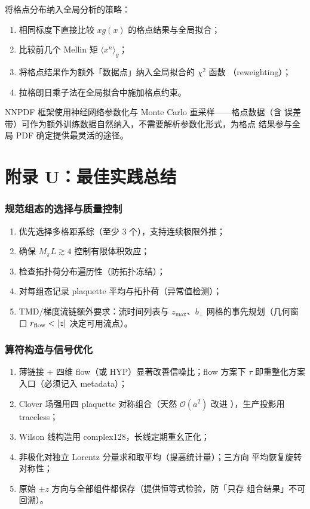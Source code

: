 \documentclass[11pt,a4paper]{ctexart}
\newcommand{\abs}[1]{\lvert #1\rvert}
\newcommand{\order}[1]{\mathcal{O}(#1)}
\newcommand{\bperp}{b_{\perp}}
\begin{document}
将格点分布纳入全局分析的策略：
\begin{enumerate}
  \item 相同标度下直接比较 $xg(x)$ 的格点结果与全局拟合；
  \item 比较前几个 Mellin 矩 $\langle x^n\rangle_g$；
  \item 将格点结果作为额外「数据点」纳入全局拟合的 $\chi^2$ 函数
  （reweighting）；
  \item 拉格朗日乘子法在全局拟合中施加格点约束。
\end{enumerate}
NNPDF 框架使用神经网络参数化与 Monte Carlo 重采样——格点数据（含
误差带）可作为额外训练数据自然纳入，不需要解析参数化形式，为格点
结果参与全局 PDF 确定提供最灵活的途径。

\section{附录 U：最佳实践总结}

\subsubsection{规范组态的选择与质量控制}

\begin{enumerate}
  \item 优先选择多格距系综（至少 3 个），支持连续极限外推；
  \item 确保 $M_\pi L\gtrsim4$ 控制有限体积效应；
  \item 检查拓扑荷分布遍历性（防拓扑冻结）；
  \item 对每组态记录 plaquette 平均与拓扑荷（异常值检测）；
  \item TMD/梯度流链额外要求：流时间列表与 $z_{\max}$、$\bperp$
  网格的事先规划（几何窗口 $r_{\rm flow}<\abs z$ 决定可用流点）。
\end{enumerate}

\subsubsection{算符构造与信号优化}

\begin{enumerate}
  \item 薄链接 + 四维 flow（或 HYP）显著改善信噪比；flow 方案下
  $\tau$ 即重整化方案入口（必须记入 metadata）；
  \item Clover 场强用四 plaquette 对称组合（天然 $\order{a^2}$ 改进
  ），生产投影用 traceless；
  \item Wilson 线构造用 complex128，长线定期重幺正化；
  \item 非极化对独立 Lorentz 分量求和取平均（提高统计量）；三方向
  平均恢复旋转对称性；
  \item 原始 $\pm z$ 方向与全部组件都保存（提供恒等式检验，防「只存
  组合结果」不可回溯）。
\end{enumerate}
\end{document}
